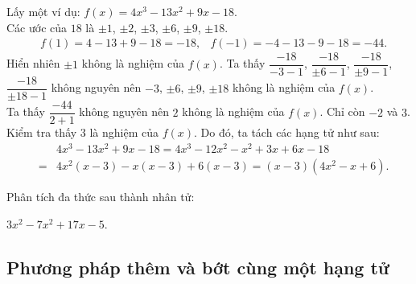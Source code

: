 Lấy một ví dụ: $f(x)=4x^3-13x^2+9x-18$.\\
Các ước của $18$ là $\pm 1$, $\pm 2$, $\pm 3$, $\pm 6$, $\pm 9$, $\pm 18$.
\begin{align*}
	&f(1)=4-13+9-18=-18, &f(-1)=-4-13-9-18=-44.
\end{align*}
Hiển nhiên $\pm 1$ không là nghiệm của $f(x)$. Ta thấy $\dfrac{-18}{-3-1}$, $\dfrac{-18}{\pm 6-1}$, $\dfrac{-18}{\pm 9-1}$, $\dfrac{-18}{\pm 18-1}$ không nguyên nên $-3$, $\pm 6$, $\pm 9$, $\pm 18$ không là nghiệm của $f(x)$.\\
Ta thấy $\dfrac{-44}{2+1}$ không nguyên nên $2$ không là nghiệm của $f(x)$. Chỉ còn $-2$ và $3$. Kiểm tra thấy $3$ là nghiệm của $f(x)$. Do đó, ta tách các hạng tử như sau:
\begin{eqnarray*}
& &4x^3-13x^2+9x-18=4x^3-12x^2-x^2+3x+6x-18\\
&=& 4x^2(x-3)-x(x-3)+6(x-3)=(x-3)(4x^2-x+6).
\end{eqnarray*}
\begin{vd}
	Phân tích đa thức sau thành nhân tử:
	\begin{center}
		$3x^2-7x^2+17x-5$.
	\end{center}
\end{vd}
\subsection{Phương pháp thêm và bớt cùng một hạng tử}
